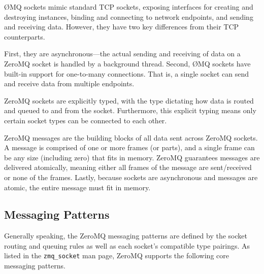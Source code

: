 \O MQ sockets mimic standard TCP sockets, exposing interfaces for creating and destroying instances, binding and
connecting to network endpoints, and sending and receiving data. However, they have two key differences from their
TCP counterparts.

First, they are asynchronous---the actual sending and receiving of data on a ZeroMQ socket is handled by a background
thread. Second, \O MQ sockets have built-in support for one-to-many connections. That is, a single socket can send and
receive data from multiple endpoints.

ZeroMQ sockets are explicitly typed, with the type dictating how data is routed and queued to and from the socket.
Furthermore, this explicit typing means only certain socket types can be connected to each other.

ZeroMQ messages are the building blocks of all data sent across ZeroMQ sockets. A message is comprised of one or more
frames (or parts), and a single frame can be any size (including zero) that fits in memory. ZeroMQ guarantees messages
are delivered atomically, meaning either all frames of the message are sent/received or none of the frames. Lastly,
because sockets are asynchronous and messages are atomic, the entire message must fit in memory.

\subsection{Messaging Patterns}

Generally speaking, the ZeroMQ messaging patterns are defined by the socket routing and queuing rules as well as each
socket's compatible type pairings. As listed in the \texttt{zmq\_socket} man page\cite{zmq-socket}, ZeroMQ supports the
following core messaging patterns.

